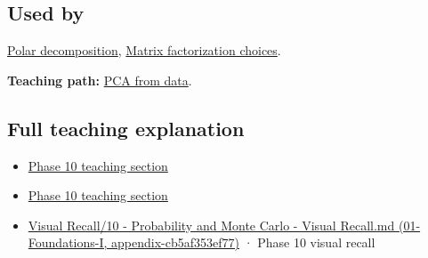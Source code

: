 \subsection{Used by}\label{appendix-ad175ef3c5bf-used-by}

\hyperref[appendix-73f5bcf7a462]{Polar decomposition}, \hyperref[appendix-221a483bec2d]{Matrix factorization choices}.

\textbf{Teaching path:} \hyperref[02-foundations-ii-ch024-pca-turns-a-cloud-of-points-into-measured-variation]{PCA from data}.

\subsection{Full teaching explanation}\label{appendix-ad175ef3c5bf-full-teaching-explanation}

\begin{itemize}
\tightlist
\item
  \hyperref[02-foundations-ii-ch023-expected-values-describe-centers-covariance-describes-dependence]{Phase 10 teaching section}
\item
  \hyperref[02-foundations-ii-ch024-waiting-times-event-counts-and-covariance-geometry]{Phase 10 teaching section}
\item
  \href{../01-Foundations-I/main.pdf\#nameddest=appendix-cb5af353ef77}{Visual Recall/10 - Probability and Monte Carlo - Visual Recall.md (01-Foundations-I, appendix-cb5af353ef77)} · Phase 10 visual recall
\end{itemize}
